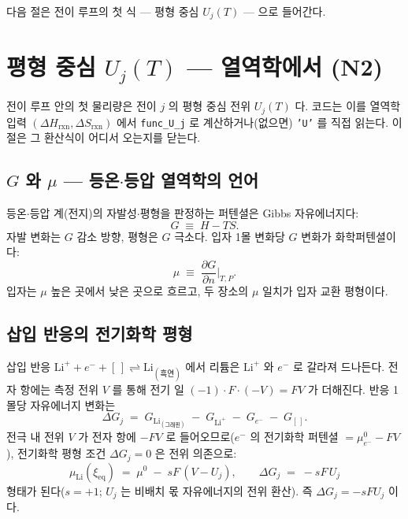 \documentclass[11pt,a4paper]{article}
\newcommand{\eq}{\mathrm{eq}}
\newcommand{\rxn}{\mathrm{rxn}}
\newcommand{\code}[1]{\texttt{#1}}
\begin{document}
다음 절은 전이 루프의 첫 식 — 평형 중심 $U_j(T)$ — 으로 들어간다.

\section{평형 중심 $U_j(T)$ — 열역학에서 (N2)}\label{sec:center}
전이 루프 안의 첫 물리량은 전이 $j$ 의 평형 중심 전위 $U_j(T)$ 다. 코드는 이를 열역학 입력 $(\Delta H_\rxn,\Delta S_\rxn)$
에서 \code{func\_U\_j} 로 계산하거나(없으면) \code{'U'} 를 직접 읽는다. 이 절은 그 환산식이 어디서 오는지를 닫는다.

\subsection{$G$ 와 $\mu$ — 등온$\cdot$등압 열역학의 언어}
등온$\cdot$등압 계(전지)의 자발성$\cdot$평형을 판정하는 퍼텐셜은 Gibbs 자유에너지다:
\begin{equation}
G\;\equiv\;H-TS.
\label{eq:gibbsdef}
\end{equation}
자발 변화는 $G$ 감소 방향, 평형은 $G$ 극소다. 입자 1몰 변화당 $G$ 변화가 화학퍼텐셜이다:
\begin{equation}
\mu\;\equiv\;\frac{\partial G}{\partial n}\bigg|_{T,P}.
\label{eq:mudef}
\end{equation}
입자는 $\mu$ 높은 곳에서 낮은 곳으로 흐르고, 두 장소의 $\mu$ 일치가 입자 교환 평형이다.

\subsection{삽입 반응의 전기화학 평형}
삽입 반응 $\mathrm{Li}^++e^-+[\,]\rightleftharpoons\mathrm{Li}_{(\text{흑연})}$ 에서 리튬은 $\mathrm{Li}^+$ 와 $e^-$ 로 갈라져 드나든다.
전자 항에는 측정 전위 $V$ 를 통해 전기 일 $(-1)\cdot F\cdot(-V)=FV$ 가 더해진다. 반응 1몰당 자유에너지 변화는
\begin{equation}
\Delta G_j\;=\;G_{\mathrm{Li}_{(\text{그래핀})}}\;-\;G_{\mathrm{Li}^+}\;-\;G_{e^-}\;-\;G_{[\,]}.
\label{eq:dGreaction}
\end{equation}
전극 내 전위 $V$ 가 전자 항에 $-FV$ 로 들어오므로($e^-$ 의 전기화학 퍼텐셜 $=\mu_{e^-}^0-FV$), 전기화학 평형 조건
$\Delta G_j=0$ 은 전위 의존으로:
\begin{equation}
\mu_\mathrm{Li}(\xi_\eq)\;=\;\mu^0\;-\;sF\,(V-U_j),
\qquad \Delta G_j\;=\;-sF\,U_j
\label{eq:eqcond}
\end{equation}
형태가 된다($s=+1$; $U_j$ 는 비배치 몫 자유에너지의 전위 환산). 즉 $\Delta G_j=-sFU_j$ 이다.
\end{document}

